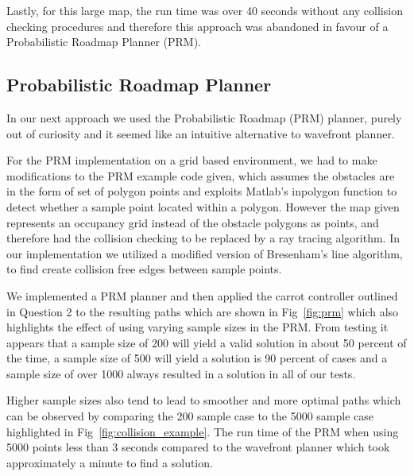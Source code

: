 \documentclass{article}
\begin{document}
Lastly, for this large map, the run time was over 40 seconds without any collision checking procedures and therefore this approach was abandoned in favour of a Probabilistic Roadmap Planner (PRM). 


\subsection{Probabilistic Roadmap Planner}
\label{subsec:prm}
In our next approach we used the Probabilistic Roadmap (PRM) planner, purely out of curiosity and it seemed like an intuitive alternative to wavefront planner. 

For the PRM implementation on a grid based environment, we had to make modifications to the PRM example code given, which assumes the obstacles are in the form of set of polygon points and exploits Matlab's inpolygon function to detect whether a sample point located within a polygon. However the map given represents an occupancy grid instead of the obstacle polygons as points, and therefore had the collision checking to be replaced by a ray tracing algorithm. In our implementation we utilized a modified version of Bresenham's line algorithm, to find create collision free edges between sample points.

We implemented a PRM planner and then applied the carrot controller outlined in Question 2 to the resulting paths which are shown in  Fig~\ref{fig:prm} which also highlights the effect of using varying sample sizes in the PRM. From testing it appears that a sample size of 200 will yield a valid solution in about 50 percent of the time, a sample size of 500 will yield a solution is 90 percent of cases and a sample size of over 1000 always resulted in a solution in all of our tests. 

Higher sample sizes also tend to lead to smoother and more optimal paths which can be observed by comparing  the 200 sample case to the 5000 sample case highlighted in Fig~\ref{fig:collision_example}. The run time of the PRM when using 5000 points less than 3 seconds compared to the wavefront planner which took approximately a minute to find a solution.  
\end{document}
